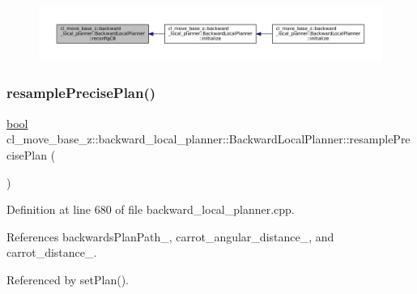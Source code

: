 \nopagebreak
\begin{figure}[H]
\begin{center}
\leavevmode
\includegraphics[width=350pt]{classcl__move__base__z_1_1backward__local__planner_1_1BackwardLocalPlanner_a62e4783adae03ce92190d855a021b91d_icgraph}
\end{center}
\end{figure}
\mbox{\label{classcl__move__base__z_1_1backward__local__planner_1_1BackwardLocalPlanner_a100fe8bdaaf89b0fa54ecf2aef0966ed}} 
\subsubsection{\texorpdfstring{resample\+Precise\+Plan()}{resamplePrecisePlan()}}
{\footnotesize\ttfamily \hyperlink{classbool}{bool} cl\+\_\+move\+\_\+base\+\_\+z\+::backward\+\_\+local\+\_\+planner\+::\+Backward\+Local\+Planner\+::resample\+Precise\+Plan (\begin{DoxyParamCaption}{ }\end{DoxyParamCaption})\hspace{0.3cm}{\ttfamily [private]}}



Definition at line 680 of file backward\+\_\+local\+\_\+planner.\+cpp.



References backwards\+Plan\+Path\+\_\+, carrot\+\_\+angular\+\_\+distance\+\_\+, and carrot\+\_\+distance\+\_\+.



Referenced by set\+Plan().


